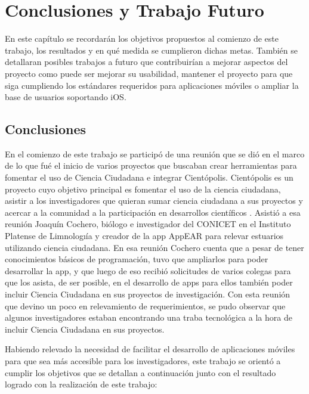 \chapter{Conclusiones y Trabajo Futuro}

En este capítulo se recordarán los objetivos propuestos al comienzo de este trabajo, los resultados y en qué medida se cumplieron dichas metas. También se detallaran posibles trabajos a futuro que contribuirían a mejorar aspectos del proyecto como puede ser mejorar su usabilidad, mantener el proyecto para que siga cumpliendo los estándares requeridos para aplicaciones móviles o ampliar la base de usuarios soportando iOS.

\section{Conclusiones}

En el comienzo de este trabajo se participó de una reunión que se dió en el marco de lo que fué el inicio de varios proyectos que buscaban crear herramientas para fomentar el uso de Ciencia Ciudadana e integrar Cientópolis. Cientópolis es un proyecto cuyo objetivo principal es fomentar el uso de la ciencia ciudadana, asistir a los investigadores que quieran sumar ciencia ciudadana a sus proyectos y acercar a la comunidad a la participación en desarrollos científicos \cite{cientopolis}. Asistió a esa reunión Joaquín Cochero, biólogo e investigador del CONICET en el Instituto Platense de Limnologıía y creador de la app AppEAR para relevar estuarios utilizando ciencia ciudadana. En esa reunión Cochero cuenta que a pesar de tener conocimientos básicos de programación, tuvo que ampliarlos para poder desarrollar la app, y que luego de eso recibió solicitudes de varios colegas para que los asista, de ser posible, en el desarrollo de apps para ellos también poder incluir Ciencia Ciudadana en sus proyectos de investigación. Con esta reunión que devino un poco en relevamiento de requerimientos, se pudo observar que algunos investigadores estaban encontrando una traba tecnológica a la hora de incluir Ciencia Ciudadana en sus proyectos.

Habiendo relevado la necesidad de facilitar el desarrollo de aplicaciones móviles para que sea más accesible para los investigadores, este trabajo se orientó a cumplir los objetivos que se detallan a continuación junto con el resultado logrado con la realización de este trabajo:


